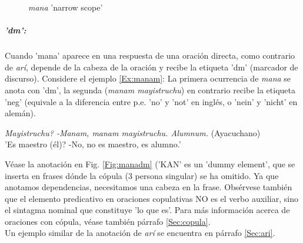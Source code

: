 \documentclass[a4paper,11pt,DIV12]{scrartcl}
\begin{document}
\begin{figure}
 \begin{center}
\end{center}
\caption{{\em mana} 'narrow scope'}\label{Fig:mananarrow}
\end{figure}
\subparagraph{'dm':}
Cuando 'mana' aparece en una respuesta de una oraci\'on directa, como contrario de {\em ar\'i}, depende de la cabeza de la oraci\'on y recibe la etiqueta 'dm' (marcador de discurso). Considere el ejemplo \ref{Ex:manam}: La primera ocurrencia de {\em mana} se anota con 'dm', la segunda ({\em manam mayistruchu}) en contrario recibe la etiqueta 'neg' (equivale a la diferencia entre p.e. 'no' y 'not' en ingl\'es, o 'nein' y 'nicht' en alem\'an).
\begin{examples}
\item\label{Ex:manam} {\em Mayistruchu? -Manam, manam mayistruchu. Alumnum.} (Ayacuchano)\\
      '{\textquestiondown}Es maestro (\'el)? -No, no es maestro, es alumno.'\\
      	\hfill{\small \citep[17]{Dedenbach02}}
\end{examples}
V\'ease la anotaci\'on en Fig. \ref{Fig:manadm} ('KAN' es un 'dummy element', que se inserta en frases d\'onde la c\'opula (3{\textordfeminine} persona singular) se ha omitido. Ya que anotamos dependencias, necesitamos una cabeza en la frase. Obs\'ervese tambi\'en que el elemento predicativo en oraciones copulativas NO es el verbo auxiliar, sino el sintagma nominal que constituye 'lo que es'. Para m\'as informaci\'on acerca de oraciones con c\'opula, v\'ease tambi\'en p\'arrafo \ref{Sec:copula}. \\
Un ejemplo similar de la anotaci\'on de {\em ar\'i} se encuentra en p\'arrafo \ref{Sec:ari}.
\end{document}
